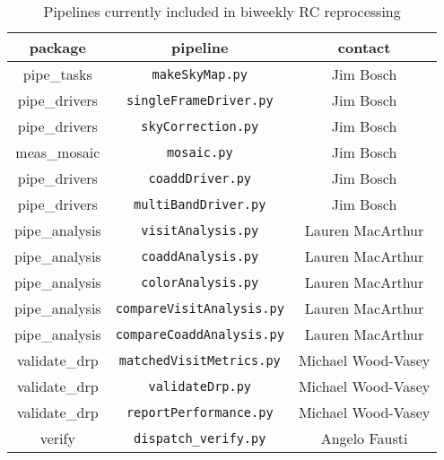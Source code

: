 \begin{table}[h]
  \caption{Pipelines currently included in biweekly RC reprocessing}
  \label{tab:liaison}
  \begin{center}
  \begin{tabular}{ccc}
    \hline\hline
    \textbf{package}  &
    \textbf{pipeline} &
    \textbf{contact}  \\
    \hline\hline
    pipe\_tasks    & \texttt{makeSkyMap.py}           & Jim Bosch \\
    pipe\_drivers  & \texttt{singleFrameDriver.py}    & Jim Bosch \\
    pipe\_drivers  & \texttt{skyCorrection.py}        & Jim Bosch \\
    meas\_mosaic   & \texttt{mosaic.py}               & Jim Bosch \\
    pipe\_drivers  & \texttt{coaddDriver.py}          & Jim Bosch \\
    pipe\_drivers  & \texttt{multiBandDriver.py}      & Jim Bosch \\
    pipe\_analysis & \texttt{visitAnalysis.py}        & Lauren MacArthur \\
    pipe\_analysis & \texttt{coaddAnalysis.py}        & Lauren MacArthur \\
    pipe\_analysis & \texttt{colorAnalysis.py}        & Lauren MacArthur \\
    pipe\_analysis & \texttt{compareVisitAnalysis.py} & Lauren MacArthur \\
    pipe\_analysis & \texttt{compareCoaddAnalysis.py} & Lauren MacArthur \\
    validate\_drp  & \texttt{matchedVisitMetrics.py}  & Michael Wood-Vasey \\
    validate\_drp  & \texttt{validateDrp.py}          & Michael Wood-Vasey \\
    validate\_drp  & \texttt{reportPerformance.py}    & Michael Wood-Vasey \\
    verify         & \texttt{dispatch\_verify.py}     & Angelo Fausti \\
    \hline\hline
  \end{tabular}
  \end{center}
\end{table}
